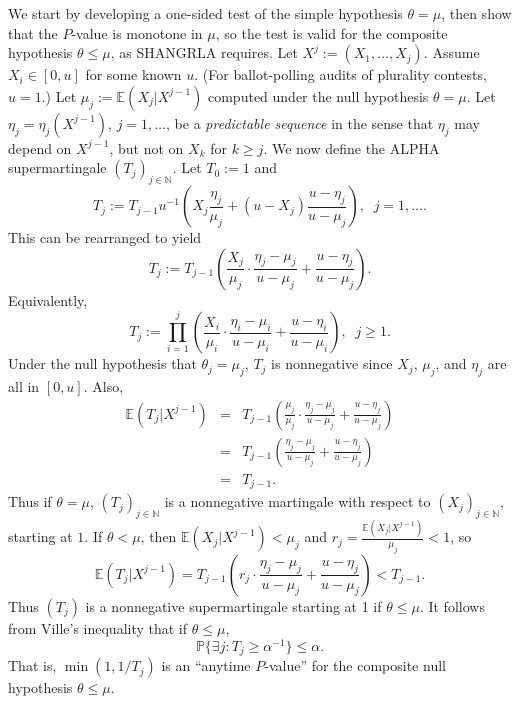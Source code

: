 \documentclass[aoas]{imsart}
\newcommand{\EE}{\mathbb{E}}
\renewcommand{\Pr}{\mathbb{P}}
\begin{document}
We start by developing a one-sided test of the simple hypothesis $\theta = \mu$, then show that the $P$-value is monotone in
$\mu$, so the test is valid for the composite hypothesis $\theta \le \mu$, as SHANGRLA requires.
Let $X^j := (X_1, \ldots, X_j)$.
Assume $X_i \in [0, u]$ for some known $u$. 
(For ballot-polling audits of plurality contests, $u=1$.)
Let $\mu_j := \EE(X_j | X^{j-1})$ computed under the null hypothesis $\theta = \mu$. 
Let $\eta_j = \eta_j(X^{j-1})$, $j=1, \ldots$, be a \emph{predictable sequence} in the sense that 
$\eta_j$ may depend on $X^{j-1}$, but not on $X_k$ for $k \ge j$.
We now define the ALPHA supermartingale $(T_j)_{j \in \mathbb{N}}$.
Let $T_0 := 1$ and
\begin{equation}
    T_j := T_{j-1} u^{-1}\left ( X_j\frac{\eta_j}{\mu_j} + (u-X_j) \frac{u-\eta_j}{u-\mu_j} \right ), \;\; j=1, \ldots . \label{eq:alphaBRAVOdef}
\end{equation}
This can be rearranged to yield
\begin{equation}
    T_j := T_{j-1} \left ( \frac{X_j}{\mu_j} \cdot \frac{\eta_j-\mu_j}{u-\mu_j} + \frac{u-\eta_j}{u-\mu_j} \right ). \label{eq:alphaMult}
\end{equation}
Equivalently,
\begin{equation}
    T_j := \prod_{i=1}^j \left ( \frac{X_i}{\mu_i} \cdot \frac{\eta_i-\mu_i}{u-\mu_i} + \frac{u-\eta_i}{u-\mu_i} \right ), \;\; j \ge 1. \label{eq:alphaMultProd}
\end{equation}
Under the null hypothesis that $\theta_j = \mu_j$, $T_j$ is nonnegative since $X_j$, $\mu_j$, and $\eta_j$
are all in $[0, u]$.
Also,
\begin{eqnarray}
    \EE (T_j | X^{j-1} ) &=& T_{j-1} \left ( \frac{\mu_j}{\mu_j} \cdot \frac{\eta_j-\mu_j}{u-\mu_j} + \frac{u-\eta_j}{u-\mu_j} \right ) \nonumber \\
    &=&  T_{j-1} \left ( \frac{\eta_j-\mu_j}{u-\mu_j} + \frac{u-\eta_j}{u-\mu_j} \right ) \nonumber \\
    &=& T_{j-1}.
\end{eqnarray}
Thus if $\theta = \mu$, $(T_j)_{j \in \mathbb{N}}$ is a nonnegative martingale with respect to $(X_j)_{j \in \mathbb{N}}$, starting at $1$.
If $\theta < \mu$, then $\EE (X_j | X^{j-1}) < \mu_j$ and $r_j = \frac{\EE (X_j | X^{j-1})}{\mu_j} < 1$, so
\begin{equation} \label{eq:supermartingale}
    \EE (T_j | X^{j-1} ) = T_{j-1} \left ( r_j \cdot \frac{\eta_j-\mu_j}{u-\mu_j} + \frac{u-\eta_j}{u-\mu_j} \right ) < T_{j-1}.
\end{equation}
Thus $(T_j)$ is a nonnegative supermartingale starting at 1 if $\theta \le \mu$.
It follows from Ville's inequality \citep{ville39} that if $\theta \le \mu$,
\begin{equation} \label{eq:p-value-adapt}
\Pr \{ \exists j :  T_j \ge \alpha^{-1} \} \le \alpha.
\end{equation}
That is, $\min(1, 1/T_j)$ is an ``anytime $P$-value'' for the composite null hypothesis $\theta \le \mu$.
\end{document}
